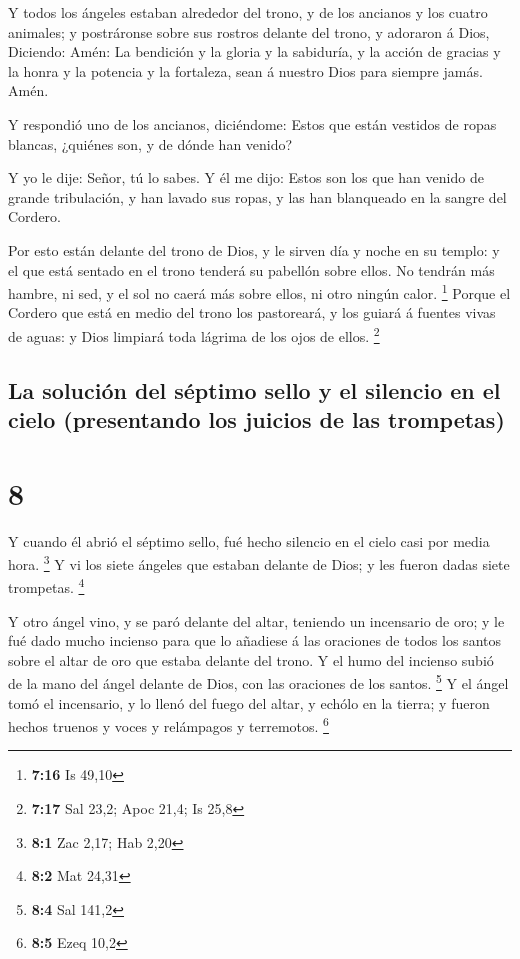  Y todos los ángeles estaban alrededor del trono, y de los
ancianos y los cuatro animales; y postráronse sobre sus rostros delante
del trono, y adoraron á Dios,  Diciendo: Amén: La bendición
y la gloria y la sabiduría, y la acción de gracias y la honra y la
potencia y la fortaleza, sean á nuestro Dios para siempre jamás. Amén.

 Y respondió uno de los ancianos, diciéndome: Estos que
están vestidos de ropas blancas, ¿quiénes son, y de dónde han venido?

 Y yo le dije: Señor, tú lo sabes. Y él me dijo: Estos son
los que han venido de grande tribulación, y han lavado sus ropas, y las
han blanqueado en la sangre del Cordero.

 Por esto están delante del trono de Dios, y le sirven día
y noche en su templo: y el que está sentado en el trono tenderá su
pabellón sobre ellos.  No tendrán más hambre, ni sed, y el
sol no caerá más sobre ellos, ni otro ningún calor. \footnote{\textbf{7:16}
  Is 49,10}  Porque el Cordero que está en medio del trono
los pastoreará, y los guiará á fuentes vivas de aguas: y Dios limpiará
toda lágrima de los ojos de ellos. \footnote{\textbf{7:17} Sal 23,2;
  Apoc 21,4; Is 25,8}

\hypertarget{la-soluciuxf3n-del-suxe9ptimo-sello-y-el-silencio-en-el-cielo-presentando-los-juicios-de-las-trompetas}{%
\subsection{La solución del séptimo sello y el silencio en el cielo
(presentando los juicios de las
trompetas)}\label{la-soluciuxf3n-del-suxe9ptimo-sello-y-el-silencio-en-el-cielo-presentando-los-juicios-de-las-trompetas}}

\hypertarget{section-7}{%
\section{8}\label{section-7}}

 Y cuando él abrió el séptimo sello, fué hecho silencio en
el cielo casi por media hora. \footnote{\textbf{8:1} Zac 2,17; Hab 2,20}
 Y vi los siete ángeles que estaban delante de Dios; y les
fueron dadas siete trompetas. \footnote{\textbf{8:2} Mat 24,31}

 Y otro ángel vino, y se paró delante del altar, teniendo un
incensario de oro; y le fué dado mucho incienso para que lo añadiese á
las oraciones de todos los santos sobre el altar de oro que estaba
delante del trono.  Y el humo del incienso subió de la mano
del ángel delante de Dios, con las oraciones de los santos. \footnote{\textbf{8:4}
  Sal 141,2}  Y el ángel tomó el incensario, y lo llenó del
fuego del altar, y echólo en la tierra; y fueron hechos truenos y voces
y relámpagos y terremotos. \footnote{\textbf{8:5} Ezeq 10,2}


